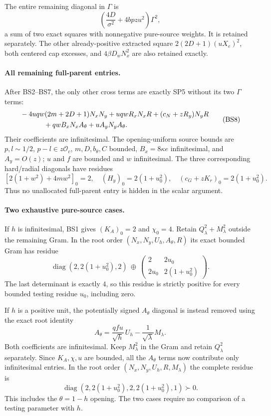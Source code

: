 The entire remaining diagonal in $\Gamma$ is
\[
 \left(\frac{4D}{\sigma^2}+4bpzu^2\right)\Gamma^2,
 \tag{BS7}
\]
a sum of two exact squares with nonnegative pure-source weights.
It is retained separately. The other already-positive extracted square
$2(2D+1)(uX_e)^2$, both centered cap excesses, and
$4\beta D_wN_x^2$ are also retained exactly.

\paragraph{All remaining full-parent entries.}
After BS2--BS7, the only other cross terms are exactly SP5 without
its two $\Gamma$ terms:
\[
\begin{split}
 &-4uqw(2m+2D+1)N_xN_y
 +uqwR_xN_xR+(c_N+zR_y)N_yR\\
 &\hspace{12mm}+qwB_xN_xA_\theta+uA_yN_yA_\theta .
\end{split}                                                   \tag{BS8}
\]
Their coefficients are infinitesimal. The opening-uniform source
bounds are $p,l\sim1/2$, $p-l\in z\mathcal O_c$,
$m,D,b_\theta,C$ bounded, $B_x=8\kappa e$ infinitesimal, and
$A_y=O(z)$; $u$ and $f$ are bounded and $w$ infinitesimal.
The three corresponding hard/radial diagonals have residues
\[
 [2(1+w^2)+4mw^2]_0=2,\quad
 (H_y)_0=2(1+u_0^2),\quad
 (c_G+zK_r)_0=2(1+u_0^2).                          \tag{BS9}
\]
Thus no unallocated full-parent entry is hidden in the scalar argument.

\paragraph{Two exhaustive pure-source cases.}
If $h$ is infinitesimal, BS1 gives $(K_A)_0=2$ and $\chi_0=4$.
Retain $Q_\lambda^2+M_\lambda^2$ outside the remaining Gram.
In the root order $(N_x,N_y,U_h,A_\theta,R)$ its exact bounded
Gram has residue
\[
 \operatorname{diag}(2,2(1+u_0^2),2)\ \oplus\
 \begin{pmatrix}2&2u_0\\2u_0&2(1+u_0^2)\end{pmatrix}.
 \tag{BS10}
\]
The last determinant is exactly $4$, so this residue is strictly
positive for every bounded testing residue $u_0$, including zero.

If $h$ is a positive unit, the potentially signed $A_\theta$ diagonal
is instead removed using the exact root identity
\[
 A_\theta=\frac{qfu}{\sqrt h}\,U_h
                       -\frac1{\sqrt\lambda}M_\lambda.        \tag{BS11}
\]
Both coefficients are infinitesimal. Keep $M_\lambda^2$ in the Gram
and retain $Q_\lambda^2$ separately. Since $K_A,\chi,u$ are bounded,
all the $A_\theta$ terms now contribute only infinitesimal entries.
In the root order $(N_x,N_y,U_h,R,M_\lambda)$ the complete residue is
\[
 \operatorname{diag}(2,2(1+u_0^2),2,2(1+u_0^2),1)\succ0.
 \tag{BS12}
\]
This includes the $\theta=1-h$ opening. The two cases require no
comparison of a testing parameter with $h$.

